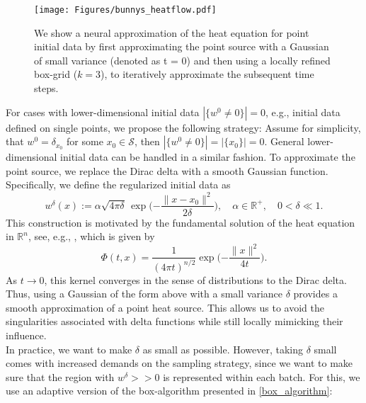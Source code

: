 \documentclass[draft,12pt,openany]{book}
\def\S{\mathcal{S}}
\theoremstyle{plainnormal}
\theoremstyle{remark}
\begin{document}
\begin{figure}
    
    \texttt{[image: Figures/bunnys\_heatflow.pdf]}
    
\caption{We show a neural approximation of the heat equation for point initial data by first approximating the point source with a Gaussian of small variance (denoted as t = 0) and then using a locally refined box-grid ($k=3$), to iteratively approximate the subsequent time steps.} \label{point_bunny}
\end{figure}
For cases with lower-dimensional initial data $|\{w^0 \neq0\}| = 0$, e.g., initial data defined on single points, we propose the following strategy:
Assume for simplicity, that $w^0 = \delta_{x_0}$ for some $x_0\in\S$, then $|\{w^0 \neq0\}| = |\{x_0\}| = 0$. General lower-dimensional initial data can be handled in a similar fashion. To approximate the point source, we replace the Dirac delta with a smooth Gaussian function. Specifically, we define the regularized initial data as
\[
w^{\delta}(x) := \alpha \sqrt{4\pi\delta} \, \exp\Bigg({-\frac{\|x - x_0\|^2}{2\delta}}\Bigg), \quad \alpha \in \mathbb{R}^+, \quad 0 < \delta \ll 1.
\]
This construction is motivated by the fundamental solution of the heat equation in \( \mathbb{R}^n \), see, e.g., \cite{evans2}, which is given by
\[
\Phi(t, x) = \frac{1}{(4\pi t)^{n/2}} \exp\Big({-\frac{\|x\|^2}{4t}}\Big).
\]
As \( t \to 0 \), this kernel converges in the sense of distributions to the Dirac delta. Thus, using a Gaussian of the form above with a small variance \( \delta \) provides a smooth approximation of a point heat source. This allows us to avoid the singularities associated with delta functions while still locally mimicking their influence.\\
In practice, we want to make $\delta$ as small as possible. However, taking $\delta$ small comes with increased demands on the sampling strategy, since we want to make sure that the region with $w^\delta >> 0$ is represented within each batch. For this, we use an adaptive version of the box-algorithm presented in \cref{box_algorithm}: 
\end{document}
